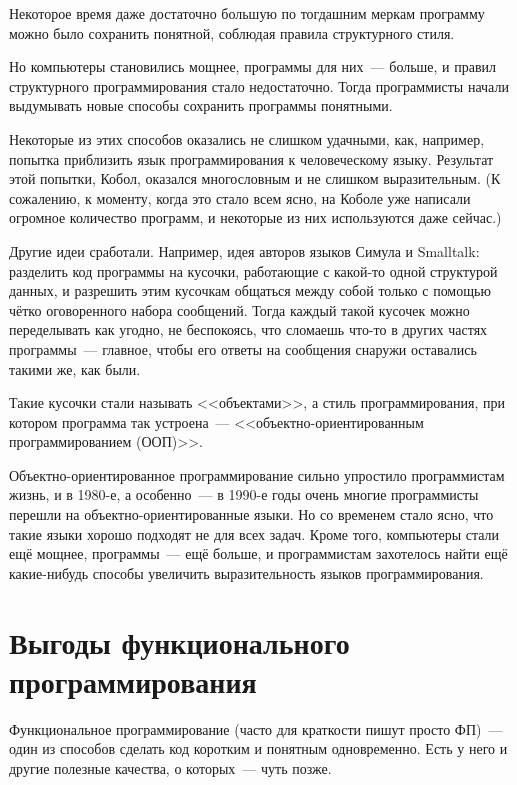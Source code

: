 \documentclass[
  paper=a4,
  fontsize=14pt,
  openany,
  appendixprefix=true
]{scrbook}
\begin{document}
Некоторое время даже достаточно большую по тогдашним меркам программу можно было сохранить понятной, соблюдая правила структурного стиля.

Но компьютеры становились мощнее, программы для них~--- больше, и правил структурного программирования стало недостаточно. Тогда программисты начали выдумывать новые способы сохранить программы понятными.

Некоторые из этих способов оказались не слишком удачными, как, например, попытка приблизить язык программирования к человеческому языку. Результат этой попытки, Кобол, оказался многословным и не слишком выразительным. (К сожалению, к моменту, когда это стало всем ясно, на Коболе уже написали огромное количество программ, и некоторые из них используются даже сейчас.)

Другие идеи сработали. Например, идея авторов языков Симула и Smalltalk: разделить код программы на кусочки, работающие с какой-то одной структурой данных, и разрешить этим кусочкам общаться между собой только с помощью чётко оговоренного набора сообщений. Тогда каждый такой кусочек можно переделывать как угодно, не беспокоясь, что сломаешь что-то в других частях программы~--- главное, чтобы его ответы на сообщения снаружи оставались такими же, как были.

{\emergencystretch=15pt Такие кусочки стали называть <<объектами>>, а стиль программирования, при котором программа так устроена~--- <<объектно-ори\-ен\-ти\-ро\-ван\-ным прог\-рам\-ми\-ро\-ва\-ни\-ем (ООП)>>.

}
Объектно-ориентированное программирование сильно упростило программистам жизнь, и в 1980-е, а особенно~--- в 1990-е годы очень многие программисты перешли на объектно-ориентированные языки. Но со временем стало ясно, что такие языки хорошо подходят не для всех задач. Кроме того, компьютеры стали ещё мощнее, программы~--- ещё больше, и программистам захотелось найти ещё какие-нибудь способы увеличить выразительность языков программирования.

\section{Выгоды функционального программирования}
\label{benefits}

Функциональное программирование (часто для краткости пишут просто ФП)~--- один из способов сделать код коротким и понятным одновременно. Есть у него и другие полезные качества, о которых~--- чуть позже.
\end{document}
